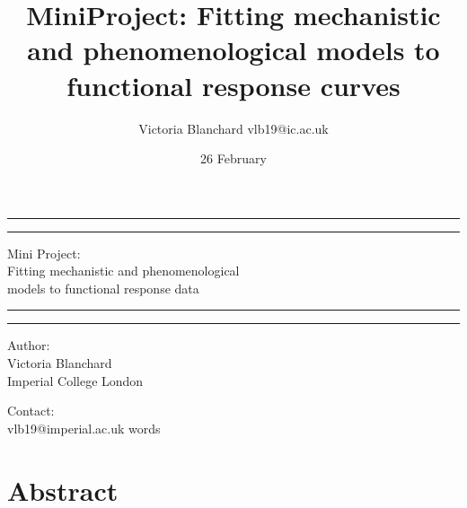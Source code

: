\documentclass[11pt]{article}
\title {MiniProject: Fitting mechanistic and phenomenological models to functional response curves}
\author{Victoria Blanchard vlb19@ic.ac.uk}
\date{26 February}
\newcommand\wordcount{}
\begin{document}
	
	\begin{titlepage}
		
		
		\centering %
		
		
		
		
		\vspace*{5\baselineskip}
		
		\rule{\textwidth}{1.6pt}\vspace*{-\baselineskip}\vspace*{2pt} %
		\rule{\textwidth}{0.4pt} %
		
		\vspace{0.75\baselineskip} %
		
		{\LARGE Mini Project: \\ Fitting mechanistic and phenomenological \\ models to functional response data} 
		
		\vspace{0.75\baselineskip} %
		
		\rule{\textwidth}{0.4pt}\vspace*{-\baselineskip}\vspace{3.2pt} 
		\rule{\textwidth}{1.6pt} 
		
		\vspace{2\baselineskip} 
		
		
		Author: \\
		Victoria Blanchard \\
		Imperial College London
		
		\vspace{1.5 \baselineskip} %
		
		Contact: \\
		vlb19@imperial.ac.uk
		\mbox{}
		\vfill
		\wordcount words
		
	\end{titlepage}
	
	\linenumbers
	\doublespacing
	
	\section*{Abstract}
	
\end{document}
